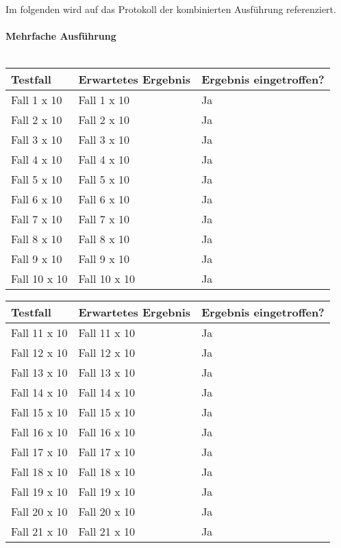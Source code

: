 \ \\ \\
Im folgenden wird auf das Protokoll der kombinierten Ausführung referenziert.\ \\ \\
\textbf{Mehrfache Ausführung}\ \\ \\
\begin{tabularx}{\textwidth}{|X|X|l|}
    \hline
    \textbf{Testfall} & \textbf{Erwartetes Ergebnis} & \textbf{Ergebnis eingetroffen?}\\
    \hline
    Fall 1 x 10 & Fall 1 x 10 & Ja\\
    \hline
    Fall 2 x 10 & Fall 2 x 10 & Ja\\
    \hline
    Fall 3 x 10 & Fall 3 x 10 & Ja\\
    \hline
    Fall 4 x 10 & Fall 4 x 10 & Ja\\
    \hline
    Fall 5 x 10 & Fall 5 x 10 & Ja\\
    \hline
    Fall 6 x 10 & Fall 6 x 10 & Ja\\
    \hline
    Fall 7 x 10 & Fall 7 x 10 & Ja\\
    \hline
    Fall 8 x 10 & Fall 8 x 10 & Ja\\
    \hline
    Fall 9 x 10 & Fall 9 x 10 & Ja\\
    \hline
    Fall 10 x 10 & Fall 10 x 10 & Ja\\
    \hline
\end{tabularx}
\begin{tabularx}{\textwidth}{|X|X|l|}
    \hline
    \textbf{Testfall} & \textbf{Erwartetes Ergebnis} & \textbf{Ergebnis eingetroffen?}\\
    \hline
    Fall 11 x 10 & Fall 11 x 10 & Ja\\
    \hline
    Fall 12 x 10 & Fall 12 x 10 & Ja\\
    \hline
    Fall 13 x 10 & Fall 13 x 10 & Ja\\
    \hline
    Fall 14 x 10 & Fall 14 x 10 & Ja\\
    \hline
    Fall 15 x 10 & Fall 15 x 10 & Ja\\
    \hline
    Fall 16 x 10 & Fall 16 x 10 & Ja\\
    \hline
    Fall 17 x 10 & Fall 17 x 10 & Ja\\
    \hline
    Fall 18 x 10 & Fall 18 x 10 & Ja\\
    \hline
    Fall 19 x 10 & Fall 19 x 10 & Ja\\
    \hline
    Fall 20 x 10 & Fall 20 x 10 & Ja\\
    \hline
    Fall 21 x 10 & Fall 21 x 10 & Ja\\
    \hline
\end{tabularx}
